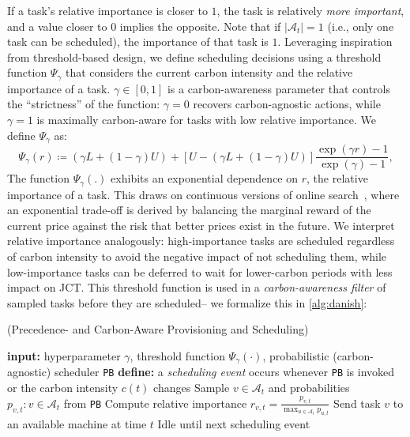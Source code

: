 \noindent If a task's relative importance is closer to $1$, the task is relatively \textit{more important}, and a value closer to $0$ implies the opposite.
Note that if $\vert \mathcal{A}_t \vert =1$ (i.e., only one task can be scheduled), the importance of that task is $1$. Leveraging inspiration from threshold-based design, we define scheduling decisions using a threshold function $\Psi_\gamma$ that considers the current carbon intensity and the relative importance of a task.
$\gamma \in [0,1]$ is a carbon-awareness parameter that controls the ``strictness'' of the function: $\gamma = 0$ recovers carbon-agnostic actions, while $\gamma = 1$ is maximally carbon-aware for tasks with low relative importance.  We define $\Psi_\gamma$ as:
{\small
\begin{equation*}
    \Psi_\gamma(r) \coloneqq \left( \gamma L + (1-\gamma) U \right) + \left[ U - \left( \gamma L + (1-\gamma) U \right)\right] \frac{\exp (\gamma r) -1 }{\exp (\gamma) -1}, \label{eq:Psi}
\end{equation*}
}
\noindent The function $\Psi_\gamma(.)$ exhibits an exponential dependence on $r$, the relative importance of a task.  This draws on continuous versions of online search~\cite{ElYaniv:01, Zhou:08}, where an exponential trade-off is derived by balancing the marginal reward of the current price against the risk that better prices exist in the future. 
We interpret relative importance analogously: high-importance tasks are scheduled regardless of carbon intensity to avoid the negative impact of not scheduling them, while low-importance tasks can be deferred to wait for lower-carbon periods with less impact on JCT. 
This threshold function is used in a \textit{carbon-awareness filter} of sampled tasks before they are scheduled-- we formalize this in \autoref{alg:danish}:











\begin{algorithm}[t]
	\caption{\PCAPS (Precedence- and Carbon-Aware Provisioning and Scheduling) }
	\label{alg:danish}
    {\small
	\begin{algorithmic}[1]
		\State \textbf{input:} hyperparameter $\gamma$, threshold function $\Psi_\gamma(\cdot)$, probabilistic (carbon-agnostic) scheduler \texttt{PB}
        \State \textbf{define:} a \textit{scheduling event} occurs whenever \texttt{PB} is invoked or the carbon intensity $c(t)$ changes
        \State Sample $v \in \mathcal{A}_t$ and probabilities $p_{v,t} : v \in \mathcal{A}_t$ from \texttt{PB}
        \State Compute relative importance $r_{v,t} = \frac{p_{v,t}}{\max_{u \in \mathcal{A}_t} p_{u,t}}$
        \State Send task $v$ to an available machine at time $t$
        \Else
        \State Idle until next scheduling event
        \EndIf
        \EndIf
        \EndWhile
	\end{algorithmic}
    }
\end{algorithm}	

